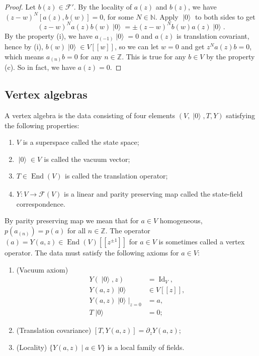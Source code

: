 \documentclass[a4paper, 12pt, reqno]{amsart}
\theoremstyle{remark}
\numberwithin{equation}{subsection}
\DeclareMathOperator{\Id}{Id}
\DeclareMathOperator{\End}{End}
\DeclareMathOperator{\vac}{|0\rangle}
\DeclareMathOperator{\zero}{\overline{0}}
\begin{document}
\begin{proof}
  Let $b(z) \in \mathcal{F}'$.
  By the locality of $a(z)$ and $b(z)$, we have $(z - w)^N[a(z), b(w)] = 0$, for some $N \in \mathbb{N}$.
  Apply $\vac$ to both sides to get
  \begin{equation*}
    (z - w)^Na(z)b(w)\vac = \pm(z - w)^Nb(w)a(z)\vac.
  \end{equation*}
  By the property (i), we have $a_{(-1)}\vac = 0$ and $a(z)$ is translation covariant, hence by (i), $b(w)\vac \in V[[w]]$, so we can let $w = 0$ and get $z^Na(z)b = 0$, which means $a_{(n)}b = 0$ for any $n \in \mathbb{Z}$.
  This is true for any $b \in V$ by the property (c).
  So in fact, we have $a(z) = 0$.
\end{proof}

\subsection{Vertex algebras}
\label{sec:vertex-algebras}

A vertex algebra is the data consisting of four elements $(V, \vac, T, Y)$ satisfying the following properties:
\begin{enumerate}
\item $V$ is a superspace called the state space;
\item $\vac \in V_{\zero}$ is called the vacuum vector;
\item $T \in \End(V)_{\zero}$ is called the translation operator;
\item $Y: V \to \mathcal{F}(V)$ is a linear and parity preserving map called the state-field correspondence.
\end{enumerate}
By parity preserving map we mean that for $a \in V$ homogeneous, $p(a_{(n)}) = p(a)$ for all $n \in \mathbb{Z}$.
The operator $(a) = Y(a, z) \in \End(V)[[z^{\pm 1}]]$ for $a \in V$ is sometimes called a vertex operator.
The data must satisfy the following axioms for $a \in V$:
\begin{enumerate}
\item (Vacuum axiom)
  \begin{align*}
    Y(\vac,z) &= \Id_V, \\
    Y(a, z)\vac &\in V[[z]], \\
    Y(a, z)\vac|_{z = 0} &= a, \\
    T\vac &= 0;
  \end{align*}
\item (Translation covariance) $[T, Y(a, z)] = \partial_zY(a, z)$;
\item (Locality) $\{Y(a, z) \mid a \in V\}$ is a local family of fields.
\end{enumerate}
\end{document}
